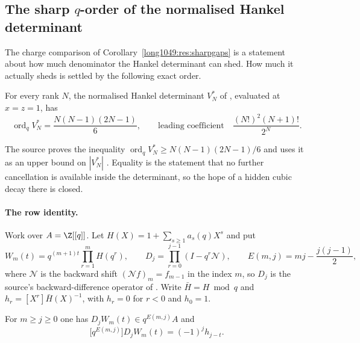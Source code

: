 \subsection{The sharp $q$-order of the normalised Hankel
determinant}\label{long1049:sec:hankel-order}

The charge comparison of Corollary~\ref{long1049:res:sharpgaps} is a statement about how
much denominator the Hankel determinant can shed.  How much it actually sheds
is settled by the following exact order.

\begin{theorem}\label{long1049:res:zudilin-sharp-qorder}
For every rank $N$, the normalised Hankel determinant $V_N^{*}$ of
\cite[Sec.~4]{zudilin2016}, evaluated at $x=z=1$, has
\[
 \operatorname{ord}_q V_N^{*}=\frac{N(N-1)(2N-1)}{6},
 \qquad
 \text{leading coefficient}\quad\frac{(N!)^{2}(N+1)!}{2^{N}} .
\]
\end{theorem}

\noindent The source proves the inequality
$\operatorname{ord}_q V_N^{*}\ge N(N-1)(2N-1)/6$ and uses it as an upper bound
on $|V_N^{*}|$ \cite[Sec.~4]{zudilin2016}.  Equality is the statement that no
further cancellation is available inside the determinant, so the hope of a
hidden cubic decay there is closed.

\paragraph{The row identity.}
Work over $A=\Z[[q]]$.  Let $H(X)=1+\sum_{s\ge1}a_s(q)X^{s}$ and put
\[
 W_m(t)=q^{(m+1)t}\prod_{r=1}^{m}H(q^{r}),
 \qquad
 D_j=\prod_{r=0}^{j-1}(I-q^{r}\mathcal N),
 \qquad
 E(m,j)=mj-\frac{j(j-1)}2,
\]
where $\mathcal N$ is the backward shift $(\mathcal Nf)_m=f_{m-1}$ in the index
$m$, so $D_j$ is the source's backward-difference operator of
\cite[Sec.~4]{zudilin2016}.  Write $\bar H=H\bmod q$ and
$h_r=[X^{r}]\bar H(X)^{-1}$, with $h_r=0$ for $r<0$ and $h_0=1$.

\begin{lemma}\label{long1049:res:allrowinitial}
For $m\ge j\ge0$ one has $D_jW_m(t)\in q^{E(m,j)}A$ and
\[
 \bigl[q^{E(m,j)}\bigr]D_jW_m(t)=(-1)^{j}h_{j-t}.
\]
\end{lemma}

